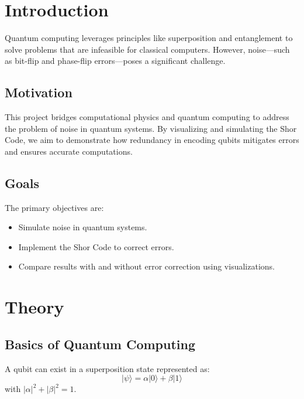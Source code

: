 \documentclass[10pt]{article}
\begin{document}
\begin{multicols}{2}

\section*{Introduction}
Quantum computing leverages principles like superposition and entanglement to solve problems that are infeasible for classical computers. However, noise—such as bit-flip and phase-flip errors—poses a significant challenge.

\subsection*{Motivation}
This project bridges computational physics and quantum computing to address the problem of noise in quantum systems. By visualizing and simulating the Shor Code, we aim to demonstrate how redundancy in encoding qubits mitigates errors and ensures accurate computations.

\subsection*{Goals}
The primary objectives are:
\begin{itemize}
    \item Simulate noise in quantum systems.
    \item Implement the Shor Code to correct errors.
    \item Compare results with and without error correction using visualizations.
\end{itemize}

\section*{Theory}
\subsection*{Basics of Quantum Computing}
A qubit can exist in a superposition state represented as:
\[
|\psi\rangle = \alpha|0\rangle + \beta|1\rangle
\]
with \( |\alpha|^2 + |\beta|^2 = 1 \).


\end{multicols}
\end{document}
